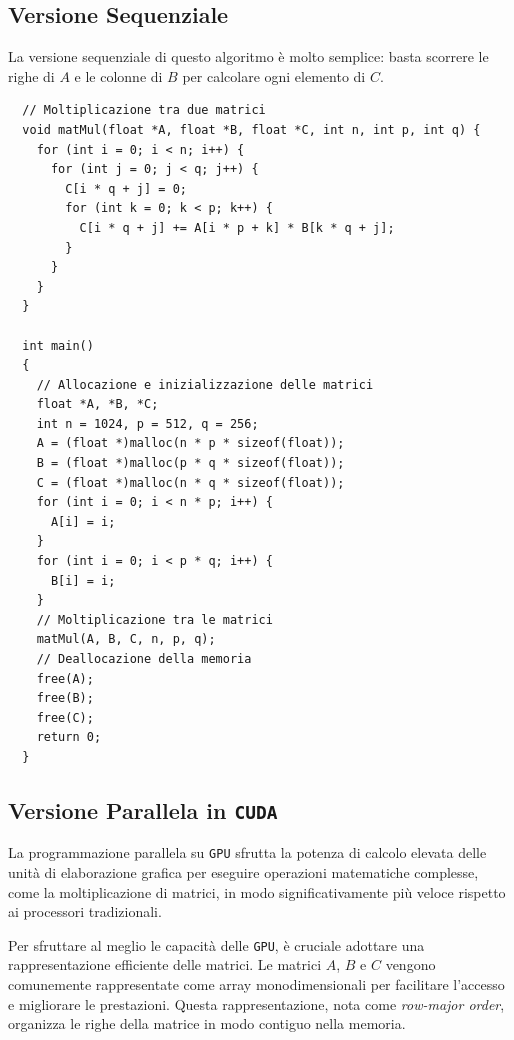 \begin{figure}[H]
\end{figure}

\subsection{Versione Sequenziale}
La versione sequenziale di questo algoritmo è molto semplice: basta
scorrere le righe di $A$ e le colonne di $B$ per calcolare ogni elemento
di $C$.

\begin{lstlisting}
  // Moltiplicazione tra due matrici
  void matMul(float *A, float *B, float *C, int n, int p, int q) {
    for (int i = 0; i < n; i++) {
      for (int j = 0; j < q; j++) {
        C[i * q + j] = 0;
        for (int k = 0; k < p; k++) {
          C[i * q + j] += A[i * p + k] * B[k * q + j];
        }
      }
    }
  }

  int main()
  {
    // Allocazione e inizializzazione delle matrici
    float *A, *B, *C;
    int n = 1024, p = 512, q = 256;
    A = (float *)malloc(n * p * sizeof(float));
    B = (float *)malloc(p * q * sizeof(float));
    C = (float *)malloc(n * q * sizeof(float));
    for (int i = 0; i < n * p; i++) {
      A[i] = i;
    }
    for (int i = 0; i < p * q; i++) {
      B[i] = i;
    }
    // Moltiplicazione tra le matrici
    matMul(A, B, C, n, p, q);
    // Deallocazione della memoria
    free(A);
    free(B);
    free(C);
    return 0;
  }
\end{lstlisting}

\subsection{Versione Parallela in \texttt{CUDA}}
La programmazione parallela su \texttt{GPU} sfrutta la potenza di
calcolo elevata delle unità di elaborazione grafica per eseguire operazioni
matematiche complesse, come la moltiplicazione di matrici,
in modo significativamente più veloce rispetto ai processori tradizionali.

Per sfruttare al meglio le capacità delle \texttt{GPU}, è cruciale adottare
una rappresentazione efficiente delle matrici. Le matrici \(A\), \(B\) e \(C\)
vengono comunemente rappresentate come array monodimensionali per facilitare
l'accesso e migliorare le prestazioni. Questa rappresentazione, nota come
\textit{row-major order}, organizza le righe della matrice in modo contiguo
nella memoria.

